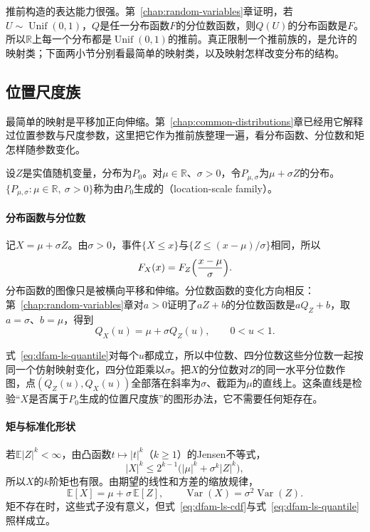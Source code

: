 推前构造的表达能力很强。第~\ref{chap:random-variables}章证明，若$U\sim\operatorname{Unif}(0,1)$，$Q$是任一分布函数$F$的分位数函数，则$Q(U)$的分布函数是$F$。所以$\mathbb{R}$上每一个分布都是$\operatorname{Unif}(0,1)$的推前。真正限制一个推前族的，是允许的映射类；下面两小节分别看最简单的映射类，以及映射怎样改变分布的结构。

\subsection{位置尺度族}
\label{sec:dfam-location-scale}

最简单的映射是平移加正向伸缩。第~\ref{chap:common-distributions}章已经用它解释过位置参数与尺度参数，这里把它作为推前族整理一遍，看分布函数、分位数和矩怎样随参数变化。

\begin{definition}[位置尺度族]
\label{def:dfam-location-scale}
设$Z$是实值随机变量，分布为$P_0$。对$\mu\in\mathbb{R}$、$\sigma>0$，令$P_{\mu,\sigma}$为$\mu+\sigma Z$的分布。$\{P_{\mu,\sigma}:\mu\in\mathbb{R},\ \sigma>0\}$称为由$P_0$生成的（location-scale family）。
\end{definition}

\paragraph{分布函数与分位数}
记$X=\mu+\sigma Z$。由$\sigma>0$，事件$\{X\leq x\}$与$\{Z\leq(x-\mu)/\sigma\}$相同，所以
\begin{equation}
  F_X(x)=F_Z\Bigl(\frac{x-\mu}{\sigma}\Bigr).
  \label{eq:dfam-ls-cdf}
\end{equation}
分布函数的图像只是被横向平移和伸缩。分位数函数的变化方向相反：第~\ref{chap:random-variables}章对$a>0$证明了$aZ+b$的分位数函数是$aQ_Z+b$，取$a=\sigma$、$b=\mu$，得到
\begin{equation}
  Q_X(u)=\mu+\sigma Q_Z(u),\qquad 0<u<1 .
  \label{eq:dfam-ls-quantile}
\end{equation}

式~\eqref{eq:dfam-ls-quantile}对每个$u$都成立，所以中位数、四分位数这些分位数一起按同一个仿射映射变化，四分位距乘以$\sigma$。把$X$的分位数对$Z$的同一水平分位数作图，点$(Q_Z(u),Q_X(u))$全部落在斜率为$\sigma$、截距为$\mu$的直线上。这条直线是检验“$X$是否属于$P_0$生成的位置尺度族”的图形办法，它不需要任何矩存在。

\paragraph{矩与标准化形状}
若$\mathbb{E}\lvert Z\rvert^{k}<\infty$，由凸函数$t\mapsto\lvert t\rvert^{k}$（$k\geq1$）的Jensen不等式，
\[
  \lvert X\rvert^{k}\leq2^{k-1}\bigl(\lvert\mu\rvert^{k}+\sigma^{k}\lvert Z\rvert^{k}\bigr),
\]
所以$X$的$k$阶矩也有限。由期望的线性和方差的缩放规律，
\begin{equation}
  \mathbb{E}[X]=\mu+\sigma\,\mathbb{E}[Z],\qquad\operatorname{Var}(X)=\sigma^{2}\operatorname{Var}(Z).
  \label{eq:dfam-ls-moments}
\end{equation}
矩不存在时，这些式子没有意义，但式~\eqref{eq:dfam-ls-cdf}与式~\eqref{eq:dfam-ls-quantile}照样成立。

